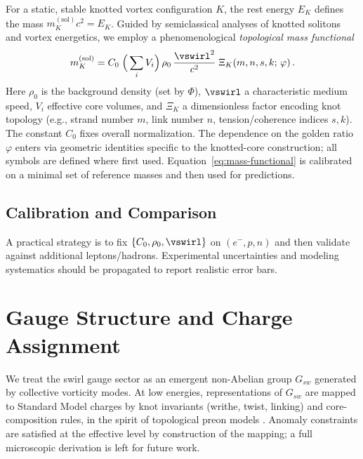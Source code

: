 \documentclass[12pt]{article}
\begin{document}
    For a static, stable knotted vortex configuration $K$, the rest energy $E_K$ defines the mass $m_K^{(\mathrm{sol})} c^2 = E_K$. Guided by semiclassical analyses of knotted solitons \cite{Faddeev1997} and vortex energetics, we employ a phenomenological \emph{topological mass functional}
    \begin{equation}
        m_K^{(\mathrm{sol})}
        = C_0\; \Big(\sum_i V_i\Big)\, \rho_0\, \frac{\vswirl
^2}{c^2}\; \Xi_K(m,n,s,k;\,\varphi)\,.
        \label{eq:mass-functional}
    \end{equation}
    Here $\rho_0$ is the background density (set by $\Phi$), $\vswirl
$ a characteristic medium speed, $V_i$ effective core volumes, and $\Xi_K$ a dimensionless factor encoding knot topology (e.g., strand number $m$, link number $n$, tension/coherence indices $s,k$). The constant $C_0$ fixes overall normalization. The dependence on the golden ratio $\varphi$ enters via geometric identities specific to the knotted-core construction; all symbols are defined where first used. Equation~\eqref{eq:mass-functional} is calibrated on a minimal set of reference masses and then used for predictions.

    \subsection{Calibration and Comparison}
    A practical strategy is to fix $\{C_0,\rho_0, \vswirl
\}$ on $(e^-,p,n)$ and then validate against additional leptons/hadrons. Experimental uncertainties and modeling systematics should be propagated to report realistic error bars.

    \section{Gauge Structure and Charge Assignment}

    We treat the swirl gauge sector as an emergent non-Abelian group $G_{\!sw}$ generated by collective vorticity modes. At low energies, representations of $G_{\!sw}$ are mapped to Standard Model charges by knot invariants (writhe, twist, linking) and core-composition rules, in the spirit of topological preon models \cite{BilsonThompson2007}. Anomaly constraints are satisfied at the effective level by construction of the mapping; a full microscopic derivation is left for future work.
\end{document}
